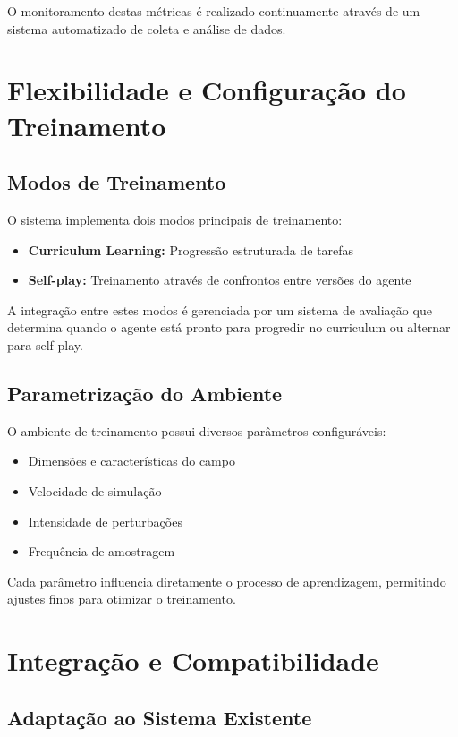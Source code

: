 O monitoramento destas métricas é realizado continuamente através de um sistema automatizado de coleta e análise de dados.

\section{Flexibilidade e Configuração do Treinamento}

\subsection{Modos de Treinamento}

O sistema implementa dois modos principais de treinamento:

\begin{itemize}
    \item \textbf{Curriculum Learning:} Progressão estruturada de tarefas
    \item \textbf{Self-play:} Treinamento através de confrontos entre versões do agente
\end{itemize}

A integração entre estes modos é gerenciada por um sistema de avaliação que determina quando o agente está pronto para progredir no curriculum ou alternar para self-play.

\subsection{Parametrização do Ambiente}

O ambiente de treinamento possui diversos parâmetros configuráveis:

\begin{itemize}
    \item Dimensões e características do campo
    \item Velocidade de simulação
    \item Intensidade de perturbações
    \item Frequência de amostragem
\end{itemize}

Cada parâmetro influencia diretamente o processo de aprendizagem, permitindo ajustes finos para otimizar o treinamento.

\section{Integração e Compatibilidade}

\subsection{Adaptação ao Sistema Existente}

